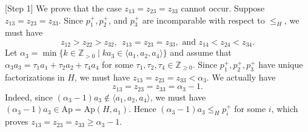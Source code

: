 \documentclass[12pt]{amsart}
\numberwithin{equation}{section}
\theoremstyle{definition}
\newcommand{\Ap}{\mathrm{Ap}}
\begin{document}
[Step 1]
We prove that the case
$z_{13}=z_{23}=z_{33}$ cannot occur.
Suppose $z_{13}=z_{23}=z_{33}$.
Since $p_1^+,p_2^+$, and $p_3^+$ are incomparable with respect to $\leq _H$,
we must have
\[
z_{12}> z_{22} > z_{32},\
\ z_{13}=z_{23}=z_{33},
\text{ and }
z_{14} < z_{24} < z_{34}.
\]
Let $\alpha_3=\min \{k \in \mathbb Z_{>0}\mid k a_3 \in \langle a_1,a_2,a_4\rangle\}$ and assume that $\alpha_3 a_3= \tau_1 a_1+ \tau_2 a_2 + \tau_4 a_4$ for some $\tau_1,\tau_2,\tau_4 \in \mathbb Z_{\geq 0}$.
Since $p_1^+,p_2^+,p_3^+$ have unique factorizations in $H$,
we must have $z_{13}=z_{23}=z_{33}<\alpha_3$.
We actually have
\[ z_{13}=z_{23}=z_{33}=\alpha_3-1.\]
Indeed, since $(\alpha_3-1)a_3 \not \in \langle a_1,a_2,a_4\rangle$, we must have $(\alpha_3-1) a_3 \in \Ap=\Ap(H,a_1)$.
Hence $(\alpha_3-1)a_3 \leq_H p^+_i$ for some $i$,
which proves $z_{13}=z_{23}=z_{33}\geq \alpha_3-1$.
\end{document}

